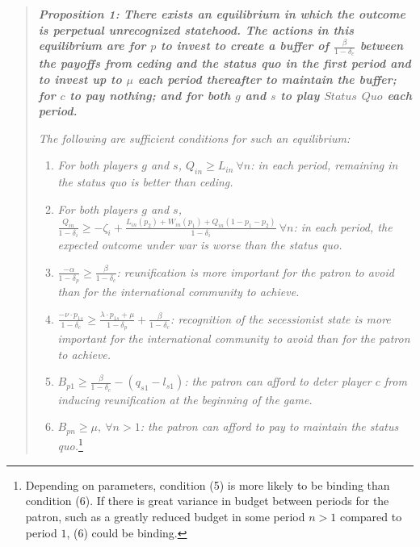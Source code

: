 \documentclass[12pt]{article}
\newcommand{\de}{\delta}
\begin{document}
\newpage
\begin{quotation}
\noindent \bf \emph{Proposition 1:} \rm  \emph{There exists an equilibrium in which the outcome is perpetual unrecognized statehood. The actions in this equilibrium are for $p$ to invest to create a buffer of $\frac{\beta}{1-\delta_c}$ between the payoffs from ceding and the status quo in the first period and to invest up to $\mu$ each period thereafter to maintain the buffer; for $c$ to pay nothing; and for both $g$ and $s$ to play $Status$ $Quo$ each period.}

\emph{The following are sufficient conditions for such an equilibrium: }

\begin{enumerate}
\item \textit{For both players $g$ and $s$, $Q_{in} \geq L_{in} \ \forall n$: in each period, remaining in the status quo is better than ceding.}

\item \emph{For both players $g$ and $s$, $\frac {Q_{in}}{1-\delta_i} \geq  -\zeta_i+\frac{L_{in}(p_2) +W_{in}(p_1)+Q_{in}(1-p_1-p_2)}{1-\delta_i} \ \forall n$: in each period, the expected outcome under war is worse than the status quo.}

\item \textit{$\frac{-\alpha}{1-\de_p} \geq \frac {\beta}{1-\delta_c}$: reunification is more important for the patron to avoid than for the international community to achieve.}

\item  \textit{$\frac {-\nu\cdot p_{1s}}{1-\delta_c} \geq \frac{\lambda \cdot p_{1s} + \mu}{1 -\de_p} + \frac{\beta}{1 -\de_c}$: recognition of the secessionist state is more important for the international community to avoid than for the patron to achieve.}

\item  \textit{$B_{p1} \geq\frac{\beta}{1-\delta_c} - \left(q_{s1} - l_{s1} \right)$: the patron can afford to deter player $c$ from inducing reunification at the beginning of the game.}

\item \textit{$B_{pn} \geq \mu, \ \forall n>1$: the patron can afford to pay to maintain the status quo.}\footnote{Depending on parameters, condition (5) is more likely to be binding than condition (6). If there is great variance in budget between periods for the patron, such as a greatly reduced budget in some period $n> 1$ compared to period $1$, (6) could be binding.}

\end{enumerate}

\end{quotation}
\end{document}

